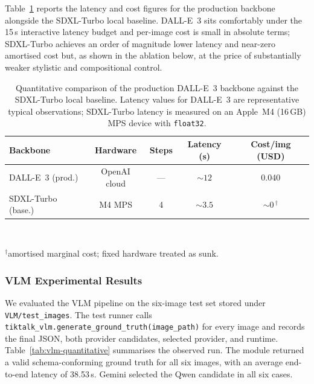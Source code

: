 \documentclass{article}
\begin{document}
Table~\ref{tab:diffusion-quantitative} reports the latency and cost
figures for the production backbone alongside the SDXL-Turbo local
baseline. DALL-E~3 sits comfortably under the 15\,s interactive
latency budget and per-image cost is small in absolute terms;
SDXL-Turbo achieves an order of magnitude lower latency and near-zero
amortised cost but, as shown in the ablation below, at the price of
substantially weaker stylistic and compositional control.

\begin{table}[t]
\centering
\caption{Quantitative comparison of the production DALL-E~3 backbone
against the SDXL-Turbo local baseline. Latency values for DALL-E~3 are
representative typical observations; SDXL-Turbo latency is measured on
an Apple~M4 (16\,GB) MPS device with \texttt{float32}.}
\label{tab:diffusion-quantitative}
\scriptsize
\setlength{\tabcolsep}{5pt}
\begin{tabular}{lcccc}
\toprule
\textbf{Backbone} & \textbf{Hardware} & \textbf{Steps} &
\textbf{Latency (s)} & \textbf{Cost/img (USD)}\\
\midrule
DALL-E~3 (prod.)     & OpenAI cloud   & ---  & $\sim\!12$ & 0.040\\
SDXL-Turbo (base.)   & M4 MPS         & 4    & $\sim\!3.5$ & $\sim\!0$\,$^{\dagger}$\\
\bottomrule
\end{tabular}
\\[0.5ex]
\raggedright\scriptsize
$^{\dagger}$amortised marginal cost; fixed hardware treated as sunk.
\end{table}

\subsubsection{VLM Experimental Results}
\label{sec:vlm-results}

We evaluated the VLM pipeline on the six-image test set stored under
\texttt{VLM/test\_images}. The test runner calls
\texttt{tiktalk\_vlm.generate\_ground\_truth(image\_path)} for every
image and records the final JSON, both provider candidates, selected
provider, and runtime. Table~\ref{tab:vlm-quantitative} summarises the
observed run. The module returned a valid schema-conforming ground truth
for all six images, with an average end-to-end latency of 38.53\,s.
Gemini selected the Qwen candidate in all six cases.
\end{document}
